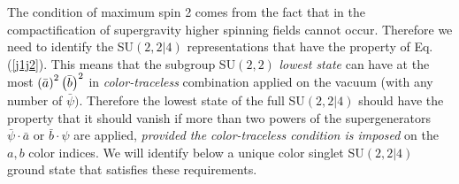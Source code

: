 \documentclass[a4paper,aps,preprint,nofootinbib]{revtex4}
\begin{document}
The condition of maximum spin 2 comes from the fact that in the
compactification of supergravity higher spinning fields cannot occur.
Therefore we need to identify the SU$\left( 2,2|4\right) $ representations
that have the property of Eq.(\ref{j1j2}). This means that the subgroup SU$%
\left( 2,2\right) $ \textit{lowest state} can have at the most $\left( \bar{%
a }\right) ^{2}\left( \bar{b}\right) ^{2} $ in \textit{color-traceless}
combination applied on the vacuum (with any number of $\bar{\psi}).$
Therefore the lowest state of the full SU$\left( 2,2|4\right) $ should have
the property that it should vanish if more than two powers of the
supergenerators $\bar{\psi}\cdot\bar{a}$ or $\bar{b}\cdot\psi$ are applied,
\textit{provided the color-traceless condition is imposed} on the $a,b$
color indices. We will identify below a unique color singlet SU$\left(
2,2|4\right) $ ground state that satisfies these requirements.
\end{document}
